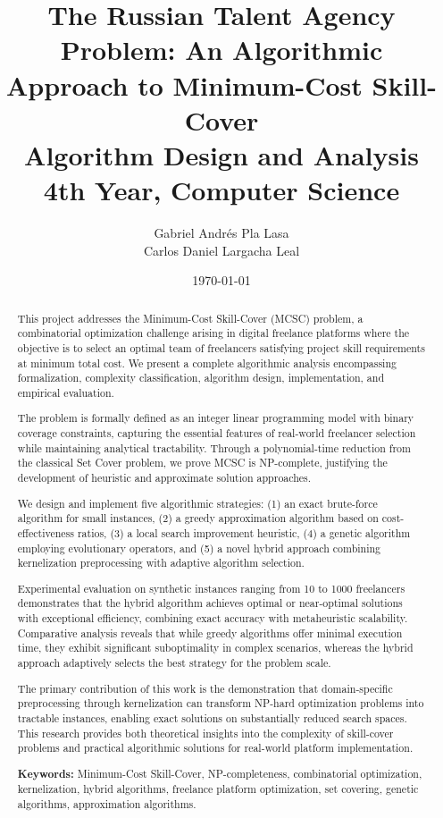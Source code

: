 \documentclass[12pt,a4paper]{article}
\title{ \textbf{The Russian Talent Agency Problem: An Algorithmic Approach to Minimum-Cost Skill-Cover} \\
	\vspace*{0.3cm} \large Algorithm Design and Analysis \\
	4th Year, Computer Science}
\author{Gabriel Andrés Pla Lasa \\ Carlos Daniel Largacha Leal}
\date{\today}
\begin{document}
	
	\maketitle
	
\begin{abstract}
	
	This project addresses the Minimum-Cost Skill-Cover (MCSC) problem, a combinatorial optimization challenge arising in digital freelance platforms where the objective is to select an optimal team of freelancers satisfying project skill requirements at minimum total cost. We present a complete algorithmic analysis encompassing formalization, complexity classification, algorithm design, implementation, and empirical evaluation.
	
	The problem is formally defined as an integer linear programming model with binary coverage constraints, capturing the essential features of real-world freelancer selection while maintaining analytical tractability. Through a polynomial-time reduction from the classical Set Cover problem, we prove MCSC is NP-complete, justifying the development of heuristic and approximate solution approaches.
	
	We design and implement five algorithmic strategies: (1) an exact brute-force algorithm for small instances, (2) a greedy approximation algorithm based on cost-effectiveness ratios, (3) a local search improvement heuristic, (4) a genetic algorithm employing evolutionary operators, and (5) a novel hybrid approach combining kernelization preprocessing with adaptive algorithm selection.
	
	Experimental evaluation on synthetic instances ranging from 10 to 1000 freelancers demonstrates that the hybrid algorithm achieves optimal or near-optimal solutions with exceptional efficiency, combining exact accuracy with metaheuristic scalability. Comparative analysis reveals that while greedy algorithms offer minimal execution time, they exhibit significant suboptimality in complex scenarios, whereas the hybrid approach adaptively selects the best strategy for the problem scale.
	
	The primary contribution of this work is the demonstration that domain-specific preprocessing through kernelization can transform NP-hard optimization problems into tractable instances, enabling exact solutions on substantially reduced search spaces. This research provides both theoretical insights into the complexity of skill-cover problems and practical algorithmic solutions for real-world platform implementation.
	
	\textbf{Keywords:} Minimum-Cost Skill-Cover, NP-completeness, combinatorial optimization, kernelization, hybrid algorithms, freelance platform optimization, set covering, genetic algorithms, approximation algorithms.

\end{abstract}
	
\end{document}
